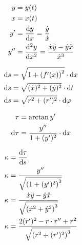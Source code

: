 \begin{boxleft}
\\
\end{boxleft}\begin{boxrightshaded}
\begin{align} 
y&=y(t)\\
x&=x(t)\\
y'&=\frac{\mathop{}\!\mathrm{d} y}{\mathop{}\!\mathrm{d} x}=\frac{\dot{y}}{\dot{x}}\\
y''&=\frac{\mathop{}\!\mathrm{d}^2 y}{\mathop{}\!\mathrm{d} x^2}=\frac{\dot{x}\ddot{y}-\dot{y}\ddot{x}}{\dot{x}^3}
\end{align}\end{boxrightshaded}

\begin{boxleft}
\end{boxleft}\begin{boxrightshaded}
\begin{align} 
\mathop{}\!\mathrm{d} s&=\sqrt{1+\left(f'(x)\right)^2}\cdot \mathop{}\!\mathrm{d} x\\
\mathop{}\!\mathrm{d} s&=\sqrt{(\dot{x})^2+(\dot{y})^2}\cdot \mathop{}\!\mathrm{d} t\\
\mathop{}\!\mathrm{d} s&=\sqrt{r^2+(r')^2}\cdot \mathop{}\!\mathrm{d} \varphi
\end{align}\end{boxrightshaded}

\begin{boxleft}
\end{boxleft}\begin{boxrightshaded}
\begin{align} 
\tau&=\arctan y'\\
\mathop{}\!\mathrm{d} \tau&=\frac{y''}{1+(y')^2}\cdot \mathop{}\!\mathrm{d} x
\end{align}\end{boxrightshaded}

\begin{boxleft}
\end{boxleft}\begin{boxrightshaded}
\begin{align} 
\kappa&=\frac{\mathop{}\!\mathrm{d} \tau}{\mathop{}\!\mathrm{d} s}\\
\kappa&=\frac{y''}{\sqrt{\left(1+(y')^2\right)^3}}\\
\kappa&=\frac{\dot{x}\ddot{y}-\dot{y}\ddot{x}}{\sqrt{\left(\dot{x}^2+\dot{y}^2\right)^3}}\\
\kappa&=\frac{2(r')^2-r\cdot r''+r^2}{\sqrt{\left(r^2+(r')^2\right)^3}}
\end{align}\end{boxrightshaded}

